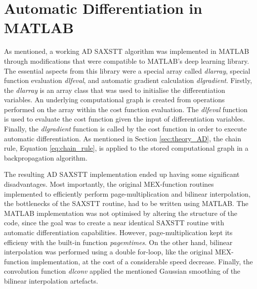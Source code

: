 \section{Automatic Differentiation in MATLAB}%
\label{sec:AD_matlab}
As mentioned,
a working AD SAXSTT algorithm was implemented  in MATLAB
through modifications that were compatible to MATLAB's deep learning library.
The essential aspects from this library were a special array called \emph{dlarray}, special function evaluation \emph{dlfeval}, and automatic gradient calculation \emph{dlgradient}.
Firstly, the \emph{dlarray} is an array class that was used to initialise the differentiation variables.
An underlying computational graph is created from operations performed on the array within the cost function evaluation.
The \emph{dlfeval} function is used to evaluate the cost function given the input of differentiation variables.
Finally, the \emph{dlgradient} function is called by the cost function in order to execute automatic differentiation.
As mentioned in Section \ref{sec:theory_AD}, the chain rule, Equation \eqref{eq:chain_rule}, is applied to the stored computational graph in a backpropagation algorithm.


The resulting AD SAXSTT implementation ended up having some significant disadvantages.
Most importantly, the original MEX-function routines implemented to efficiently perform page-multiplication and bilinear interpolation, the bottlenecks of the SAXSTT routine, had to be written using MATLAB.
The MATLAB implementation was not optimised by altering the structure of the code, since the goal was to create a near identical SAXSTT routine with automatic differentiation capabilities.
However, page-multiplication kept its efficieny with the built-in function \emph{pagemtimes}.
On the other hand, bilinear interpolation was performed using a double for-loop, like the original MEX-function implementation, at the cost of a considerable speed decrease.
Finally, the convolution function \emph{dlconv} applied the mentioned Gaussian smoothing of the bilinear interpolation artefacts.


